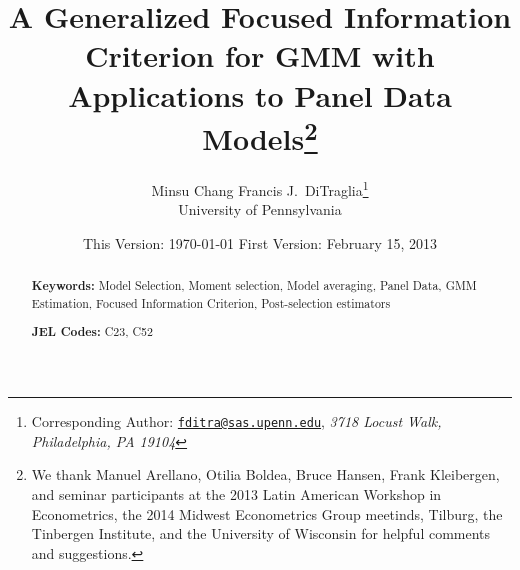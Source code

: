 \documentclass[12pt]{article}
\begin{document}
\title{A Generalized Focused Information Criterion for GMM with Applications to Panel Data Models\footnote{We thank Manuel Arellano, Otilia Boldea, Bruce Hansen, Frank Kleibergen, and seminar participants at the 2013 Latin American Workshop in Econometrics, the 2014 Midwest Econometrics Group meetinds, Tilburg, the Tinbergen Institute, and the University of Wisconsin for helpful comments and suggestions.}}

\author{Minsu Chang \hspace{1em} Francis J.\ DiTraglia\footnote{Corresponding Author:
\href{mailto:fditra@sas.upenn.edu}{\texttt{fditra@sas.upenn.edu}}, \emph{3718 Locust Walk, Philadelphia, PA 19104}}
\\ University of Pennsylvania}

\date{\footnotesize This Version: \today \hspace{0.5em} First Version: February 15, 2013}

\maketitle 
\begin{abstract}
	

	\bigskip
	\noindent\textbf{Keywords:} 
  Model Selection, Moment selection, Model averaging, Panel Data, GMM Estimation, Focused Information Criterion, Post-selection estimators

	\medskip
	\noindent\textbf{JEL Codes:} C23, C52 
\end{abstract}














\appendix
\singlespacing





\end{document}
